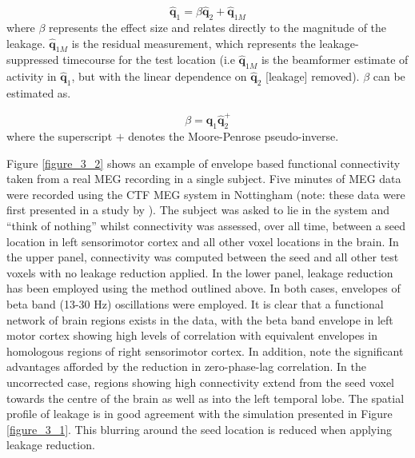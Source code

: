 \begin{equation}
\hat{\mathbf{q}}_1 = \beta\hat{\mathbf{q}}_2 + \hat{\mathbf{q}}_{1M}
\end{equation} where $\beta$ represents the effect size and relates directly to the magnitude of the leakage. $\hat{\mathbf{q}}_{1M}$ is the residual measurement, which represents the leakage-suppressed timecourse for the test location (i.e $\hat{\mathbf{q}}_{1M}$ is the beamformer estimate of activity in $\hat{\mathbf{q}}_1$, but with the linear dependence on $\hat{\mathbf{q}}_{2}$ [leakage] removed). $\beta$ can be estimated as.

\begin{equation}
\beta = \hat{\mathbf{q}}_1\hat{\mathbf{q}}_2^+ \label{eqn_3_7}
\end{equation} where the superscript $+$ denotes the Moore-Penrose pseudo-inverse. 

Figure \ref{figure_3_2} shows an example of envelope based functional connectivity taken from a real MEG recording in a single subject. Five minutes of MEG data were recorded using the CTF MEG system in Nottingham (note: these data were first presented in a study by \cite{Brookes2011a}). The subject was asked to lie in the system and “think of nothing” whilst connectivity was assessed, over all time, between a seed location in left sensorimotor cortex and all other voxel locations in the brain. In the upper panel, connectivity was computed between the seed and all other test voxels with no leakage reduction applied. In the lower panel, leakage reduction has been employed using the method outlined above. In both cases, envelopes of beta band (13-30 Hz) oscillations were employed. It is clear that a functional network of brain regions exists in the data, with the beta band envelope in left motor cortex showing high levels of correlation with equivalent envelopes in homologous regions of right sensorimotor cortex. In addition, note the significant advantages afforded by the reduction in zero-phase-lag correlation. In the uncorrected case, regions showing high connectivity extend from the seed voxel towards the centre of the brain as well as into the left temporal lobe. The spatial profile of leakage is in good agreement with the simulation presented in Figure \ref{figure_3_1}. This blurring around the seed location is reduced when applying leakage reduction.  

\clearpage

